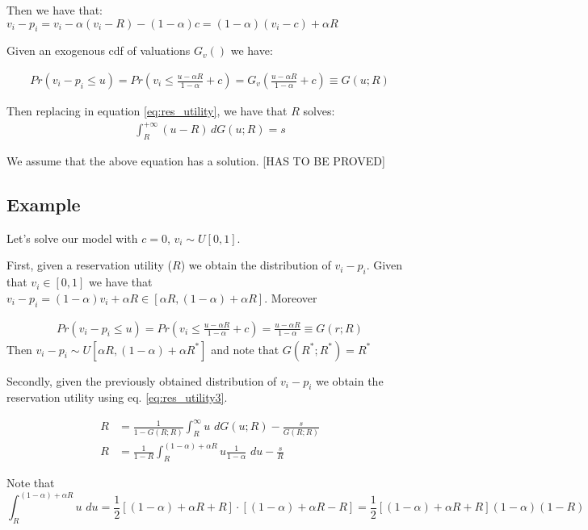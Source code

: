 \documentclass[12pt]{article}
\theoremstyle{plain}
\theoremstyle{plain}
\begin{document}
Then we have that: 
$v_i - p_i = v_i - \alpha (v_i - R)- (1-\alpha)c  = (1-\alpha)(v_i -c) +\alpha R$

Given an exogenous cdf of valuations $G_v()$ we have: 

\begin{align}\label{eq:ut_dist}
    Pr(v_i-p_i\leq u) = Pr\left(v_i \leq \frac{u-\alpha R}{1-\alpha}+c\right)= G_v\left( \frac{u-\alpha R}{1-\alpha}+c\right) \equiv G(u; R)
\end{align}

Then replacing in equation \ref{eq:res_utility}, we have that $R$ solves: 
\begin{align}\label{eq:res_utility3}
    \int_R^{+\infty} (u - R)\, dG(u; R) = s    
\end{align}

We assume that the above equation has a solution. [HAS TO BE PROVED]


\subsection{Example}

Let's solve our model with $c = 0$, $v_i \sim U[0,1]$.

First, given a reservation utility ($ R$) we obtain the distribution of $v_i - p_i$. 
Given that $v_i \in [0,1]$ we have that $v_i - p_i = (1-\alpha) v_i + \alpha R\in [\alpha R,(1-\alpha)+ \alpha R]$. Moreover 

\begin{align}
    Pr(v_i-p_i\leq u) = Pr\left(v_i \leq \frac{u-\alpha R}{1-\alpha}+c\right)= \frac{u-\alpha R}{1-\alpha}\equiv G(r; R)
\end{align}
Then $v_i - p_i \sim U[\alpha R, (1-\alpha) + \alpha R^*]$ and note that $G(R^*; R^*) = R^*$

Secondly, given the previously obtained distribution of $v_i -p_i$ we obtain the reservation utility using eq. \ref{eq:res_utility3}. 


\begin{align*}
        R &= \frac{1}{1-G(R; R)} \int_R^\infty u \, \, dG(u; R) -\frac{s}{G(R; R)} \\
         R &= \frac{1}{1-R} \int_{R}^{ (1-\alpha) + \alpha R} u \frac{1}{1-\alpha}\, \, du -\frac{s}{R}
\end{align*}

Note that $$ \int_{R}^{ (1-\alpha) + \alpha R} u \, \, du =\frac{1}{2} [ (1-\alpha) + \alpha R +R]\cdot [ (1-\alpha) + \alpha R - R] =  \frac{1}{2}[ (1-\alpha) + \alpha R +R] (1-\alpha)(1-  R)$$
\end{document}
